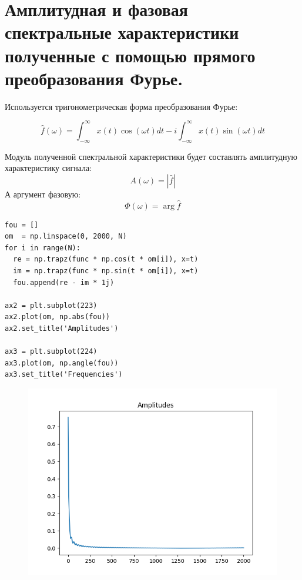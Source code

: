 \documentclass[12pt]{article}
\begin{document}
\section{Амплитудная и фазовая спектральные характеристики полученные с помощью прямого преобразования Фурье.}
Используется тригонометрическая форма преобразования Фурье:

\[\hat{f}(\omega) = \int_{-\infty}^{\infty}x(t)\cos(\omega t)dt -
 i\int_{-\infty}^{\infty}x(t)\sin(\omega t)dt\]
 
\noindent Модуль полученной спектральной характеристики будет составлять амплитудную характеристику сигнала:
\[A(\omega) = |\hat{f}|\]
А аргумент фазовую:
\[\Phi(\omega) = \arg \hat{f}\]

\begin{lstlisting}
fou = []
om  = np.linspace(0, 2000, N)
for i in range(N):
  re = np.trapz(func * np.cos(t * om[i]), x=t)
  im = np.trapz(func * np.sin(t * om[i]), x=t)
  fou.append(re - im * 1j)

ax2 = plt.subplot(223)
ax2.plot(om, np.abs(fou))
ax2.set_title('Amplitudes')

ax3 = plt.subplot(224)
ax3.plot(om, np.angle(fou))
ax3.set_title('Frequencies')
\end{lstlisting}

\begin{figure}[!htb]
\centering
\includegraphics[scale=1.00]{amplitudes.png}
\caption{}
\label{}
\end{figure}
\end{document}
